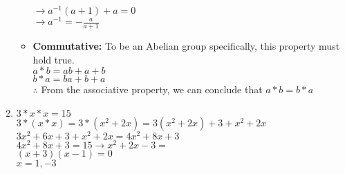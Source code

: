 \documentclass{article}
\begin{document}
\begin{enumerate}[label=(\alph*)]
\begin{itemize}
							         $\rightarrow a^{-1}(a +1) + a = 0$ \\
							         $\rightarrow a^{-1} = -\frac{a}{a+1}$
			\item \textbf{Commutative:} To be an Abelian group specifically, this property must hold true. \\
					$ a * b = ab + a + b $ \\
					$ b * a = ba + b + a $ \\
					$\therefore$ From the associative property, we can conclude that $ a*b = b*a$ 
		\end{itemize}		 
	\item $3 * x * x = 15$ \\
	         $3 * (x * x) = 3 * (x^2 + 2x) = 3(x^2+2x) + 3 + x^2 + 2x$ \\
	         $3x^2 + 6x + 3 + x^2 + 2x = 4x^2 + 8x + 3$ \\
	         $4x^2 + 8x +3 = 15 \rightarrow x^2 + 2x - 3 =  $ \\
	         $(x+3)(x-1) = 0$ \\
	         $ x=1,-3$
\end{enumerate}
\clearpage %
\end{document}
